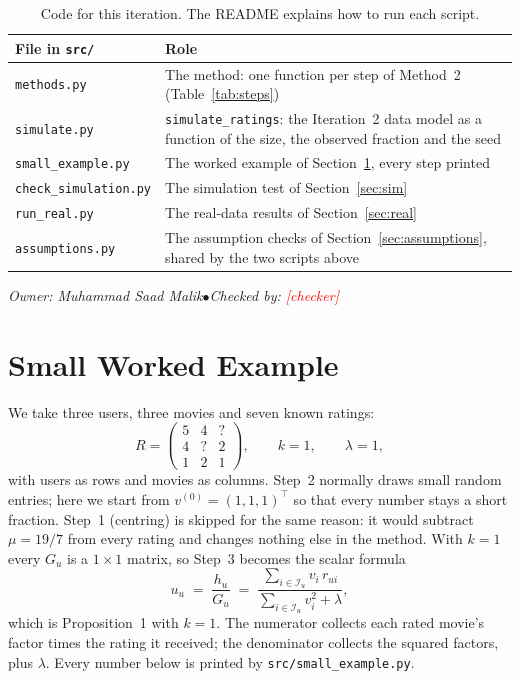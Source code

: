 \documentclass[11pt]{article}
\theoremstyle{definition}
\newcommand{\T}{^{\top}}
\newcommand{\Iu}{\mathcal{I}_u}
\newcommand{\code}[1]{\texttt{#1}}
\newcommand{\tbd}[1]{\textcolor{red}{[#1]}}
\newcommand{\owner}[2]{\par\smallskip\noindent\hfill
  {\footnotesize\itshape Owner: #1\enspace$\bullet$\enspace Checked by: #2}\par\medskip}
\begin{document}
\begin{table}[htbp]
\centering
\small
\begin{tabular}{@{}l>{\raggedright\arraybackslash}p{10.8cm}@{}}
\toprule
File in \code{src/} & Role \\
\midrule
\code{methods.py} & The method: one function per step of Method~2 (Table~\ref{tab:steps}) \\
\code{simulate.py} & \code{simulate\_ratings}: the Iteration~2 data model as a function of the
  size, the observed fraction and the seed \\
\code{small\_example.py} & The worked example of Section~\ref{sec:example}, every step printed \\
\code{check\_simulation.py} & The simulation test of Section~\ref{sec:sim} \\
\code{run\_real.py} & The real-data results of Section~\ref{sec:real} \\
\code{assumptions.py} & The assumption checks of Section~\ref{sec:assumptions}, shared by the two
  scripts above \\
\bottomrule
\end{tabular}
\caption{Code for this iteration. The README explains how to run each script.}
\label{tab:files}
\end{table}

\owner{Muhammad Saad Malik}{\tbd{checker}}

\section{Small Worked Example}
\label{sec:example}

We take three users, three movies and seven known ratings:
\[
R = \begin{pmatrix} 5 & 4 & ? \\ 4 & ? & 2 \\ 1 & 2 & 1 \end{pmatrix},
\qquad k = 1, \qquad \lambda = 1,
\]
with users as rows and movies as columns. Step~2 normally draws small random entries; here we start
from $v^{(0)} = (1, 1, 1)\T$ so that every number stays a short fraction. Step~1 (centring) is
skipped for the same reason: it would subtract $\mu = 19/7$ from every rating and changes nothing
else in the method. With $k = 1$ every $G_u$ is a $1\times 1$ matrix, so Step~3 becomes the scalar
formula
\[
u_u \;=\; \frac{h_u}{G_u} \;=\; \frac{\sum_{i\in\Iu} v_i\, r_{ui}}{\sum_{i\in\Iu} v_i^2 + \lambda},
\]
which is Proposition~1 with $k = 1$. The numerator collects each rated movie's factor times the
rating it received; the denominator collects the squared factors, plus $\lambda$. Every number
below is printed by \code{src/small\_example.py}.
\end{document}
